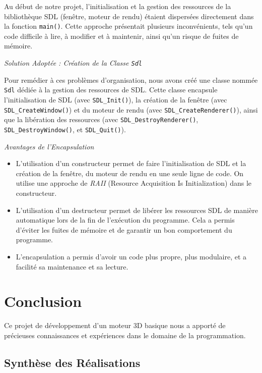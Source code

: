 \documentclass[12pt]{article}
\begin{document}
\noindent Au début de notre projet, l'initialisation et la gestion des ressources de la bibliothèque SDL (fenêtre, moteur de rendu) étaient dispersées directement dans la fonction \texttt{main()}. Cette approche présentait plusieurs inconvénients, tels qu'un code difficile à lire, à modifier et à maintenir, ainsi qu'un risque de fuites de mémoire.

\textit{Solution Adoptée : Création de la Classe \texttt{Sdl}}

\noindent Pour remédier à ces problèmes d'organisation, nous avons créé une classe nommée \texttt{Sdl} dédiée à la gestion des ressources de SDL. Cette classe encapsule l'initialisation de SDL (avec \texttt{SDL\_Init()}), la création de la fenêtre (avec \texttt{SDL\_CreateWindow()}) et du moteur de rendu (avec \texttt{SDL\_CreateRenderer()}), ainsi que la libération des ressources (avec \texttt{SDL\_DestroyRenderer()}, \texttt{SDL\_DestroyWindow()}, et \texttt{SDL\_Quit()}).

\textit{Avantages de l'Encapsulation}

\begin{itemize}
    \item  L'utilisation d'un constructeur permet de faire l'initialisation de SDL et la création de la fenêtre, du moteur de rendu en une seule ligne de code. On utilise une approche de \textit{RAII} (Resource Acquisition Is Initialization) dans le constructeur.
    \item  L'utilisation d'un destructeur permet de libérer les ressources SDL de manière automatique lors de la fin de l'exécution du programme. Cela a permis d'éviter les fuites de mémoire et de garantir un bon comportement du programme.
  \item L'encapsulation a permis d'avoir un code plus propre, plus modulaire, et a facilité sa maintenance et sa lecture.
\end{itemize}

\section{Conclusion}
\label{sec:conclusion}

\noindent Ce projet de développement d'un moteur 3D basique nous a apporté de précieuses connaissances et expériences dans le domaine de la programmation.

\subsection{Synthèse des Réalisations}
\end{document}
